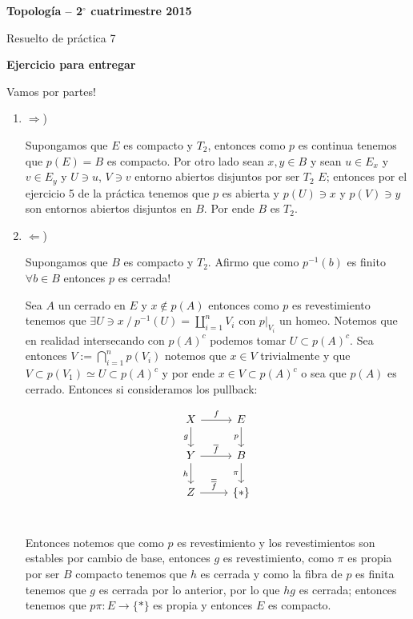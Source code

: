 \documentclass[11pt]{article}
\begin{document}
\pagestyle{empty}
\pagestyle{fancy}
\fancyfoot[CO]{\slshape \thepage}
\renewcommand{\headrulewidth}{0pt}


\centerline{\bf Topolog\'ia -- 2$^\circ$
cuatrimestre 2015}
\centerline{\sc Resuelto de pr\'actica 7}

\bigskip

\textbf{Ejercicio para entregar}

Vamos por partes!

\begin{enumerate}
\item {$\Longrightarrow$)}

Supongamos que $E$ es compacto y $T_2$, entonces como $p$ es continua tenemos que $p(E)=B$ es compacto. Por otro lado sean $x,y \in B$ y sean $u \in E_{x}$ y $v \in E_{y}$ y $U \ni u$, $V \ni v$ entorno abiertos disjuntos por ser $T_2$ $E$; entonces por el ejercicio 5 de la pr\'actica tenemos que $p$ es abierta y $p(U)\ni x$ y $p(V) \ni y$ son entornos abiertos disjuntos en $B$. Por ende $B$ es $T_2$.

\item {$\Longleftarrow$)}

Supongamos que $B$ es compacto y $T_2$. Afirmo que como $p^{-1}(b)$ es finito $\forall b \in B$ entonces $p$ es cerrada!

Sea $A$ un cerrado en $E$ y $x \not \in p(A)$ entonces como $p$ es revestimiento tenemos que $\exists U \ni x \ / \ p^{-1}(U)=\coprod_{i=1}^{n}{V_i}$ con $p|_{V_i}$ un homeo. Notemos que en realidad intersecando con $p(A)^{c}$ podemos tomar $U \subset p(A)^{c}$. Sea entonces $V:=\bigcap_{i=1}^{n}{p(V_i)}$ notemos que $x \in V$ trivialmente y que $V \subset p(V_1) \simeq U \subset p(A)^{c}$ y por ende $x \in V \subset p(A)^{c}$ o sea que $p(A)$ es cerrado. Entonces si consideramos los pullback:

\[
\begin{tikzcd}
X \arrow{r}{f} \arrow[swap]{d}{g} & E \arrow[swap]{d}{p} \\ 
Y \arrow{r}{\overline{f}} \arrow[swap]{d}{h} & B \arrow[swap]{d}{\pi} \\ 
Z \arrow{r}{\overline{\overline{f}}} & \{*\} \\
\end{tikzcd}
\]

Entonces notemos que como $p$ es revestimiento y los revestimientos son estables por cambio de base, entonces $g$ es revestimiento, como $\pi$ es propia por ser $B$ compacto tenemos que $h$ es cerrada y como la fibra de $p$ es finita tenemos que $g$ es cerrada por lo anterior, por lo que $hg$ es cerrada; entonces tenemos que $p \pi : E \rightarrow \{*\}$ es propia y entonces $E$ es compacto.


\end{enumerate}
\end{document}
